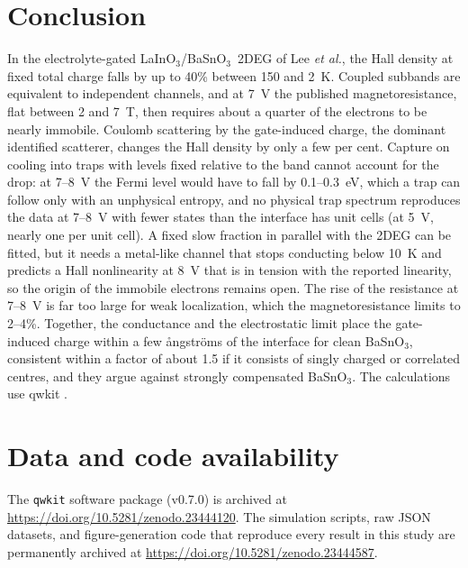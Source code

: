 \documentclass[11pt]{article}
\newcommand{\LIO}{\texorpdfstring{LaInO$_3$}{LaInO3}}
\newcommand{\BSO}{\texorpdfstring{BaSnO$_3$}{BaSnO3}}
\begin{document}
\section{Conclusion}
In the electrolyte-gated \LIO/\BSO\ 2DEG of Lee \emph{et al.}, the Hall density at fixed total charge falls by up to 40\% between 150 and 2~K. Coupled subbands are equivalent to independent channels, and at 7~V the published magnetoresistance, flat between 2 and 7~T, then requires about a quarter of the electrons to be nearly immobile. Coulomb scattering by the gate-induced charge, the dominant identified scatterer, changes the Hall density by only a few per cent. Capture on cooling into traps with levels fixed relative to the band cannot account for the drop: at 7--8~V the Fermi level would have to fall by 0.1--0.3~eV, which a trap can follow only with an unphysical entropy, and no physical trap spectrum reproduces the data at 7--8~V with fewer states than the interface has unit cells (at 5~V, nearly one per unit cell). A fixed slow fraction in parallel with the 2DEG can be fitted, but it needs a metal-like channel that stops conducting below 10~K and predicts a Hall nonlinearity at 8~V that is in tension with the reported linearity, so the origin of the immobile electrons remains open. The rise of the resistance at 7--8~V is far too large for weak localization, which the magnetoresistance limits to 2--4\%. Together, the conductance and the electrostatic limit place the gate-induced charge within a few \aa ngstr\"oms of the interface for clean \BSO, consistent within a factor of about 1.5 if it consists of singly charged or correlated centres, and they argue against strongly compensated \BSO. The calculations use qwkit \cite{qwkit}.

\section*{Data and code availability}
The \texttt{qwkit} software package (v0.7.0) is archived at \url{https://doi.org/10.5281/zenodo.23444120}. The simulation scripts, raw JSON datasets, and figure-generation code that reproduce every result in this study are permanently archived at \url{https://doi.org/10.5281/zenodo.23444587}.



\end{document}
